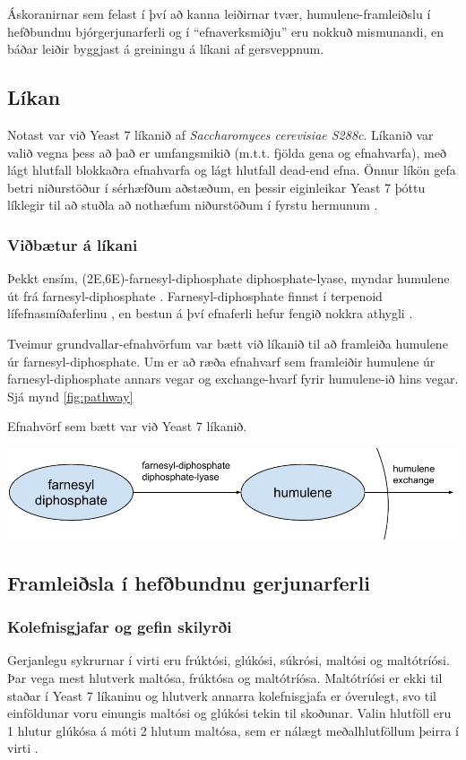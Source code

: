\documentclass[11pt]{article}
\makeatletter
\newenvironment{figureonecolumn}{\begin{minipage}{\linewidth}\begin{center}\def\@captype{figure}}{\end{center}\end{minipage}}
\makeatother
\begin{document}
\begin{multicols}{2}
Áskoranirnar sem felast í því að kanna leiðirnar tvær, humulene-framleiðslu í hefðbundnu bjórgerjunarferli og í ``efnaverksmiðju'' eru nokkuð mismunandi, en báðar leiðir byggjast á greiningu á líkani af gersveppnum.
\subsection{Líkan}
Notast var við Yeast 7 líkanið\cite{yeastsf} af \emph{Saccharomyces cerevisiae S288c}. Líkanið var valið vegna þess að það er umfangsmikið (m.t.t. fjölda gena og efnahvarfa), með lágt hlutfall blokkaðra efnahvarfa og lágt hlutfall dead-end efna. Önnur líkön gefa betri niðurstöður í sérhæfðum aðstæðum, en þessir eiginleikar Yeast 7 þóttu líklegir til að stuðla að nothæfum niðurstöðum í fyrstu hermunum \cite{heavner2015comparative}. 
\subsubsection{Viðbætur á líkani}
Þekkt ensím, (2E,6E)-farnesyl-diphosphate diphosphate-lyase, myndar humulene út frá farnesyl-diphosphate \cite[KEGG: R08373]{Kanehisa01012000}. Farnesyl-diphosphate finnst í terpenoid lífefnasmíðaferlinu \cite[KEGG: rn00900]{Kanehisa01012000}, en bestun á því efnaferli hefur fengið nokkra athygli \cite{BIT:BIT21216,misawa2011pathway,asadollahi2008production}.

Tveimur grundvallar-efnahvörfum var bætt við líkanið til að framleiða humulene úr farnesyl-diphosphate.
Um er að ræða efnahvarf sem framleiðir humulene úr farnesyl-diphosphate annars vegar og exchange-hvarf fyrir humulene-ið hins vegar. Sjá mynd \ref{fig:pathway}

\begin{figureonecolumn}
\caption[Viðbætur við Yeast 7]{Efnahvörf sem bætt var við Yeast 7 líkanið.}
\label{fig:pathway}
\includegraphics[width=\linewidth]{Pics/HumuleneAddition}
\end{figureonecolumn}
\subsection{Framleiðsla í hefðbundnu gerjunarferli}
\label{sec:hefdbundid}
\subsubsection{Kolefnisgjafar og gefin skilyrði}
Gerjanlegu sykrurnar í virti eru frúktósi, glúkósi, súkrósi, maltósi og maltótríósi. Þar vega mest hlutverk maltósa, frúktósa og maltótríósa. Maltótríósi er ekki til staðar í Yeast 7 líkaninu og hlutverk annarra kolefnisgjafa er óverulegt, svo til einföldunar voru einungis maltósi og glúkósi tekin til skoðunar. Valin hlutföll eru 1 hlutur glúkósa á móti 2 hlutum maltósa, sem er nálægt meðalhlutföllum þeirra í virti \cite{otter1967determination}. 


\end{multicols}
\end{document}

